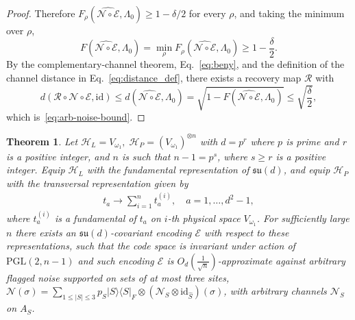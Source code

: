 \documentclass[10pt,twocolumn,superscriptaddress,aps,amsmath,amssymb,citeautoscript,floatfix,prx]{revtex4-2}
\theoremstyle{plain}
\theoremstyle{plain}
\theoremstyle{plain}
\theoremstyle{plain}
\theoremstyle{plain}
\theoremstyle{plain}
\theoremstyle{plain}
\newtheorem{smtheorem}{Theorem}[section]
\theoremstyle{definition}
\theoremstyle{plain}
\begin{document}
\begin{appendix}
\begin{proof}
    Therefore $F_\rho(\widehat{\mathcal N\circ\mathcal E},\Lambda_0)\ge1-\delta/2$ for every $\rho$, and taking the minimum over $\rho$,
    \[
        F(\widehat{\mathcal N\circ\mathcal E},\Lambda_0)
        =
        \min_\rho
        F_\rho(\widehat{\mathcal N\circ\mathcal E},\Lambda_0)
        \geq
        1-\frac{\delta}{2}.
    \]
    By the complementary-channel theorem, Eq.~\eqref{eq:beny}, and the definition of the channel distance in Eq.~\eqref{eq:distance_def}, 
    there exists a recovery map $\mathcal R$ with
    \[
        d(\mathcal R\circ\mathcal N\circ\mathcal E,\mathrm{id})
        \le
        d\left(\widehat{\mathcal N\circ\mathcal E},\Lambda_0\right)
        =
        \sqrt{1-F\left(\widehat{\mathcal N\circ\mathcal E},\Lambda_0\right)}
        \le
        \sqrt{\frac\delta2},
    \]
    which is~\eqref{eq:arb-noise-bound}.
\end{proof}

\begin{smtheorem}\label{thrm:3_transitive_scale}
    Let
    $
        \mathcal H_L=V_{\omega_1},\;
        \mathcal H_P=(V_{\omega_1})^{\otimes n}
    $
    with $d=p^r$ where $p$ is prime and $r$ is a positive integer, 
    and $n$ is such that $n-1=p^s$, where $s \geq r$ is a positive integer. 
    Equip \(\mathcal H_L\) with the fundamental representation of
    \(\mathfrak{su}(d)\), and equip \(\mathcal H_P\) with the transversal
    representation given by
    \begin{equation}
    \begin{gathered}
    t_a \rightarrow \sum_{i=1}^n t_a^{(i)}, \quad a=1,\ldots,d^2-1,
    \end{gathered}
    \end{equation} 
    where $t_a^{(i)}$ is a fundamental of $t_a$ on $i$-th physical space $V_{\omega_1}$. For sufficiently
    large $n$ there exists an $\mathfrak{su}(d)$-covariant encoding $\mathcal{E}$ with respect to these representations, 
    such that the code space is invariant under action of $\mathrm{PGL}(2, n-1)$ and such encoding $\mathcal{E}$ is $O_{d}\left(\frac{1}{\sqrt{n}}\right)$-approximate 
    against arbitrary flagged noise supported on sets of at most three sites, $\mathcal{N}(\sigma)=\sum_{1\leq|S|\leq3} p_S|S\rangle\langle S|_F \otimes\left(\mathcal{N}_S \otimes \mathrm{id}_{\hat S}\right)(\sigma)$, 
    with arbitrary channels $\mathcal N_S$ on $A_S$.
\end{smtheorem}


\end{appendix}
\end{document}
